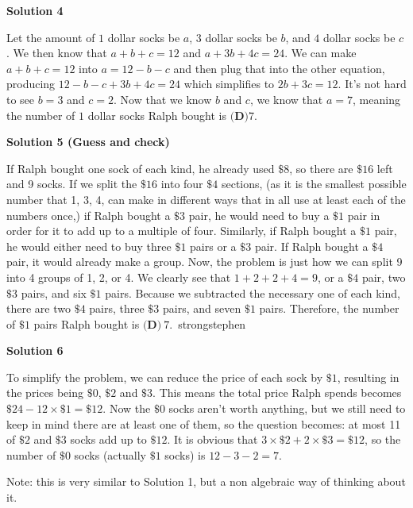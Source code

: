 \begin{enumerate}
 



\textbf{Solution 4}

Let the amount of $1$ dollar socks be $a$, $3$ dollar socks be $b$, and $4$ dollar socks be $c$. We then know that $a+b+c=12$ and $a+3b+4c=24$. We can make $a+b+c=12$ into $a=12-b-c$ and then plug that into the other equation, producing $12-b-c+3b+4c=24$ which simplifies to $2b+3c=12$. It's not hard to see $b=3$ and $c=2$. Now that we know $b$ and $c$, we know that $a=7$, meaning the number of $1$ dollar socks Ralph bought is $\boxed{\textbf{(D)} 7}$.

 



\textbf{Solution 5 (Guess and check)}

If Ralph bought one sock of each kind, he already used $\$8$, so there are $\$16$ left and 9 socks. If we split the $\$16$ into four $\$4$ sections, (as it is the smallest possible number that 1, 3, 4, can make in different ways that in all use at least each of the numbers once,) if Ralph bought a $\$3$ pair, he would need to buy a $\$1$ pair in order for it to add up to a multiple of four. Similarly, if Ralph bought a $\$1$ pair, he would either need to buy three $\$1$ pairs or a $\$3$ pair. If Ralph bought a $\$4$ pair, it would already make a group. Now, the problem is just how we can split 9 into 4 groups of 1, 2, or 4. We clearly see that $1 + 2 + 2 + 4 = 9$, or a $\$4$ pair, two $\$3$ pairs, and six $\$1$ pairs. Because we subtracted the necessary one of each kind, there are two $\$4$ pairs, three $\$3$ pairs, and seven $\$1$ pairs. Therefore, the number of $\$1$ pairs Ralph bought is $\boxed{\textbf{(D)}~7}$.~strongstephen

 



\textbf{Solution 6}

To simplify the problem, we can reduce the price of each sock by $\$1$, resulting in the prices being $\$0$, $\$2$ and $\$3$. This means the total price Ralph spends becomes $\$24-12\times\$1=\$12$. Now the $\$0$ socks aren't worth anything, but we still need to keep in mind there are at least one of them, so the question becomes: at most 11 of $\$2$ and $\$3$ socks add up to $\$12$. It is obvious that $3\times\$2+2\times\$3=\$12$, so the number of $\$0$ socks (actually $\$1$ socks) is $12-3-2=7$.

 Note: this is very similar to Solution 1, but a non algebraic way of thinking about it.


\end{enumerate}
